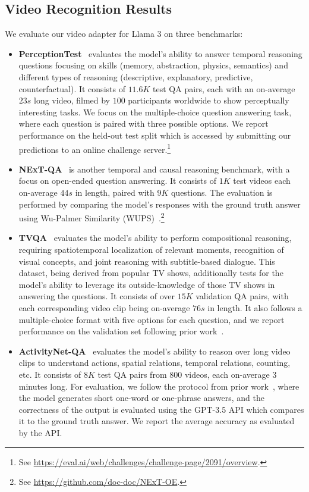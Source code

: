 \subsection{Video Recognition Results}
\label{section:results_video_recognition}

We evaluate our video adapter for Llama 3 on three benchmarks:

\begin{itemize}
\item \textbf{PerceptionTest}~\citep{patraucean2023perception} evaluates the model's ability to answer temporal reasoning questions focusing on skills (memory, abstraction, physics, semantics) and different types of reasoning (descriptive, explanatory, predictive, counterfactual). It consists of $11.6K$ test QA pairs, each with an on-average $23s$ long video, filmed by $100$ participants worldwide to show perceptually interesting tasks. We focus on the multiple-choice question answering task, where each question is paired with three possible options. We report performance on the held-out test split which is accessed by submitting our predictions to an online challenge server.\footnote{See \url{https://eval.ai/web/challenges/challenge-page/2091/overview}.}

\item \textbf{NExT-QA}~\citep{xiao2021next} is another temporal and causal reasoning benchmark, with a focus on open-ended question answering. It consists of $1K$ test videos each on-average $44s$ in length, paired with $9K$ questions. The evaluation is performed by comparing the model's responses with the ground truth answer using Wu-Palmer Similarity (WUPS)~\citep{wu1994verb}.\footnote{See \url{https://github.com/doc-doc/NExT-OE}.}

\item \textbf{TVQA}~\citep{lei2018tvqa} evaluates the model's ability to perform compositional reasoning, requiring spatiotemporal localization of relevant moments, recognition of visual concepts, and joint reasoning with subtitle-based dialogue. This dataset, being derived from popular TV shows, additionally tests for the model's ability to leverage its outside-knowledge of those TV shows in answering the questions. It consists of over $15K$ validation QA pairs, with each corresponding video clip being on-average $76s$ in length. It also follows a multiple-choice format with five options for each question, and we report performance on the validation set following prior work~\citep{openai2023gpt4blog}.

\item \textbf{ActivityNet-QA}~\citep{yu2019activityqa} evaluates the model's ability to reason over long video clips to understand actions, spatial relations, temporal relations, counting, etc. It consists of $8K$ test QA pairs from $800$ videos, each on-average $3$ minutes long. For evaluation, we follow the protocol from prior work~\citep{gemini2023gemini,lin2023video,Maaz2023VideoChatGPT}, where the model generates short one-word or one-phrase answers, and the correctness of the output is evaluated using the GPT-3.5 API which compares it to the ground truth answer. We report the average accuracy as evaluated by the API.
\end{itemize}

